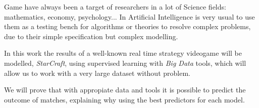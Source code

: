 Game have always been a target of researchers in a lot of Science fields:
mathematics, economy, psychology... In Artificial Intelligence is very usual
to use them as a testing bench for algorithms or theories to resolve complex
problems, due to their simple specification but complex modelling.

In this work the results of a well-known real time strategy videogame will be
modelled,
\emph{StarCraft}, using supervised learning with \emph{Big Data} tools, which
will allow us to work with a very large dataset without problem.

We will prove that with appropiate data and tools it is possible to
predict the outcome of matches, explaining why using the best predictors for
each model.
